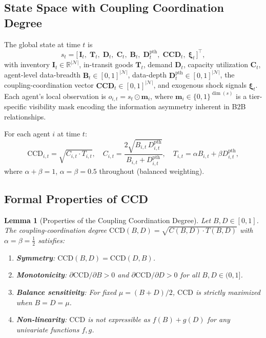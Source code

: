 \documentclass[11pt,a4paper]{article}
\theoremstyle{plain}
\newtheorem{lemma}{Lemma}
\theoremstyle{definition}
\newcommand{\R}{\mathbb{R}}
\newcommand{\N}{\mathcal{N}}
\newcommand{\CCD}{\mathrm{CCD}}
\begin{document}
\subsection{State Space with Coupling Coordination Degree}
\label{sec:statespace}

The global state at time $t$ is
\begin{equation}
s_t = \bigl[\,\mathbf{I}_t,\;\mathbf{T}_t,\;\mathbf{D}_t,\;\mathbf{C}_t,\;
             \mathbf{B}_t,\;\mathbf{D}^{\mathrm{pth}}_t,\;\mathbf{CCD}_t,\;\boldsymbol{\xi}_t
       \,\bigr]^\top,
\label{eq:state}
\end{equation}
with inventory $\mathbf{I}_t\in\R^{|\N|}$, in-transit goods $\mathbf{T}_t$, demand
$\mathbf{D}_t$, capacity utilization $\mathbf{C}_t$, agent-level data-breadth
$\mathbf{B}_t\in[0,1]^{|\N|}$, data-depth $\mathbf{D}^{\mathrm{pth}}_t\in[0,1]^{|\N|}$,
the coupling-coordination vector $\mathbf{CCD}_t\in[0,1]^{|\N|}$, and exogenous shock
signals $\boldsymbol{\xi}_t$.  Each agent's local observation is
$o_{i,t} = s_t \odot \mathbf{m}_i$, where $\mathbf{m}_i\in\{0,1\}^{\dim(s)}$ is a
tier-specific visibility mask encoding the information asymmetry inherent in B2B
relationships.

For each agent $i$ at time $t$:
\begin{equation}
\CCD_{i,t} = \sqrt{C_{i,t}\cdot T_{i,t}},\quad
C_{i,t} = \frac{2\sqrt{B_{i,t}\,D^{\mathrm{pth}}_{i,t}}}{B_{i,t}+D^{\mathrm{pth}}_{i,t}},\quad
T_{i,t} = \alpha B_{i,t} + \beta D^{\mathrm{pth}}_{i,t},
\label{eq:ccd}
\end{equation}
where $\alpha+\beta=1$, $\alpha=\beta=0.5$ throughout (balanced weighting).

\subsection{Formal Properties of CCD}
\label{sec:ccdprops}

\begin{lemma}[Properties of the Coupling Coordination Degree]
\label{lem:ccd}
Let $B,D\in[0,1]$.  The coupling-coordination degree $\CCD(B,D)=\sqrt{C(B,D)\cdot T(B,D)}$
with $\alpha=\beta=\tfrac12$ satisfies:
\begin{enumerate}[label=(\roman*),itemsep=2pt]
  \item \textbf{Symmetry}: $\CCD(B,D)=\CCD(D,B)$.
  \item \textbf{Monotonicity}: $\partial\CCD/\partial B>0$ and $\partial\CCD/\partial D>0$
    for all $B,D\in(0,1]$.
  \item \textbf{Balance sensitivity}: For fixed $\mu=(B+D)/2$, $\CCD$ is strictly
    maximized when $B=D=\mu$.
  \item \textbf{Non-linearity}: $\CCD$ is not expressible as $f(B)+g(D)$ for any
    univariate functions $f,g$.
\end{enumerate}
\end{lemma}
\end{document}
